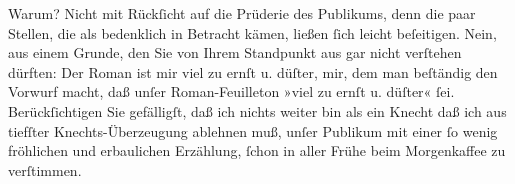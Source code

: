 \pstart
           Warum? Nicht mit Rückſicht auf die Prüderie des Publikums, denn die paar Stellen, die
               als bedenklich in Betracht kämen, ließen{ }ſich leicht beſeitigen. Nein, aus einem
               Grunde, den Sie von Ihrem Standpunkt aus gar nicht verſtehen dürften: Der Roman ist mir viel zu ernſt u.
               düſter, mir, dem man beſtändig den Vorwurf macht, daß unſer Roman-Feuilleton »viel zu
               ernſt u. düſter«{ }ſei. Berückſichtigen Sie gefälligſt, daß ich nichts weiter bin als
               ein Knecht \label{T_L00186-1v}\label{T_L00186-1} daß ich aus
               tiefſter Knechts-Überzeugung ablehnen muß, unſer Publikum mit einer{ }ſo wenig
               fröhlichen und erbaulichen Erzählung,{ }ſchon in aller Frühe beim Morgenkaffee zu
               verſtimmen.\pend
           
